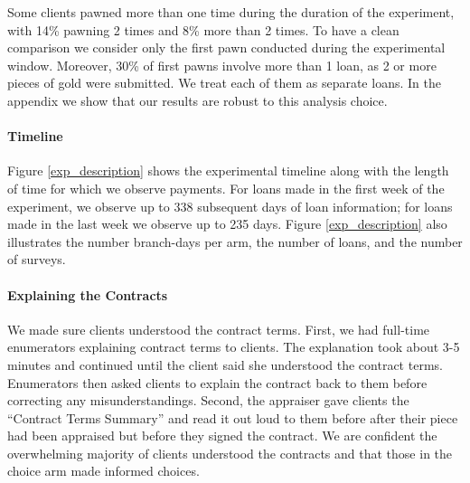 \documentclass[12pt, a4paper, colorinlistoftodos]{article}
\begin{document}
Some clients pawned more than one time during the duration of the experiment, with 14\% pawning 2 times and 8\% more than 2 times. To have a clean comparison we consider only the first pawn conducted during the experimental window. Moreover, 30\% of first pawns involve more than 1 loan, as 2 or more pieces of gold were submitted. We treat each of them as separate loans. In the appendix we show that our results are robust to this analysis choice. 

\paragraph*{Timeline} Figure \ref{exp_description} shows the experimental timeline along with the length of time for which we observe payments. For loans made in the first week of the experiment, we observe up to 338 subsequent days of loan information; for loans made in the last week we observe up to 235 days. Figure \ref{exp_description} also illustrates the number branch-days per arm, the number of loans, and the number of surveys. %

\paragraph*{Explaining the Contracts}
We made sure clients understood the contract terms.  First, we had full-time enumerators explaining contract terms to clients. The explanation took about 3-5 minutes and continued until the client said she understood the contract terms. Enumerators then asked clients to explain the contract back to them before correcting any misunderstandings. Second, the appraiser gave clients the ``Contract Terms Summary'' and read it out loud to them before after their piece had been appraised but before they signed the contract. %
We are confident the overwhelming majority of clients understood the contracts and that those in the choice arm made informed choices.
\end{document}
